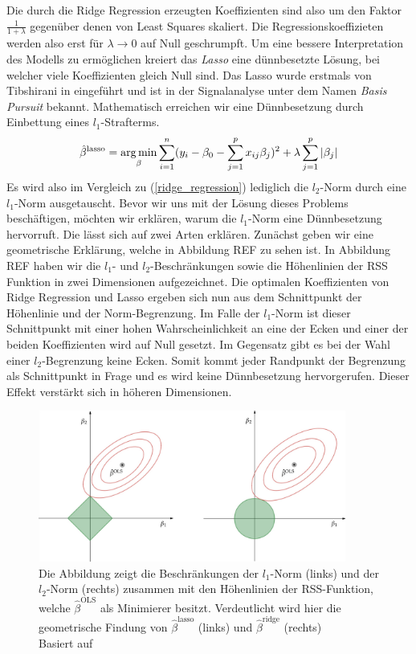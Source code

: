 Die durch die Ridge Regression erzeugten Koeffizienten sind also um den Faktor $\frac{1}{1+\lambda}$ gegenüber denen von Least Squares skaliert. Die Regressionskoeffizieten werden also erst für $\lambda \rightarrow 0$ auf Null geschrumpft. Um eine bessere Interpretation des Modells zu ermöglichen kreiert das \textit{Lasso} eine dünnbesetzte Lösung, bei welcher viele Koeffizienten gleich Null sind. Das Lasso wurde erstmals von Tibshirani in \cite{tibshirani_lasso} eingeführt und ist in der Signalanalyse unter dem Namen \textit{Basis Pursuit} \cite{chen} bekannt. Mathematisch erreichen wir eine Dünnbesetzung durch Einbettung eines $l_1$-Strafterms.
\begin{align}
\label{lasso}
\hat{\beta}^{\text{lasso}} = \operatorname*{arg\,min}_{\beta} \sum_{i=1}^{n}(y_i - \beta_0 - \sum_{j=1}^p x_{ij}\beta_j)^2 + \lambda\sum_{j=1}^p \left|\beta_j\right|
\end{align}
Es wird also im Vergleich zu (\ref{ridge_regression}) lediglich die $l_2$-Norm durch eine $l_1$-Norm ausgetauscht. Bevor wir uns mit der Lösung dieses Problems beschäftigen, möchten wir erklären, warum die $l_1$-Norm eine Dünnbesetzung hervorruft. Die lässt sich auf zwei Arten erklären. Zunächst geben wir eine geometrische Erklärung, welche in Abbildung REF zu sehen ist. In Abbildung REF haben wir die $l_1$- und $l_2$-Beschränkungen sowie die Höhenlinien der RSS Funktion in zwei Dimensionen aufgezeichnet. Die optimalen Koeffizienten von Ridge Regression und Lasso ergeben sich nun aus dem Schnittpunkt der Höhenlinie und der Norm-Begrenzung. Im Falle der $l_1$-Norm ist dieser Schnittpunkt mit einer hohen Wahrscheinlichkeit an eine der Ecken und einer der beiden Koeffizienten wird auf Null gesetzt. Im Gegensatz gibt es bei der Wahl einer $l_2$-Begrenzung keine Ecken. Somit kommt jeder Randpunkt der Begrenzung als Schnittpunkt in Frage und es wird keine Dünnbesetzung hervorgerufen. Dieser Effekt verstärkt sich in höheren Dimensionen.

\begin{figure}
\centering
\includegraphics[width = 0.9\textwidth]{figures/lasso_ridge_regression.jpg}
\caption{Die Abbildung zeigt die Beschränkungen der $l_1$-Norm (links) und der $l_2$-Norm (rechts) zusammen mit den Höhenlinien der RSS-Funktion, welche $\hat{\beta}^{\text{OLS}}$ als Minimierer besitzt. Verdeutlicht wird hier die geometrische Findung von $\hat{\beta}^{\text{lasso}}$ (links) und $\hat{\beta}^{\text{ridge}}$ (rechts)\\Basiert auf \cite{hastie_elements}}
\label{lasso_ridge_regression_figure}
\end{figure}

